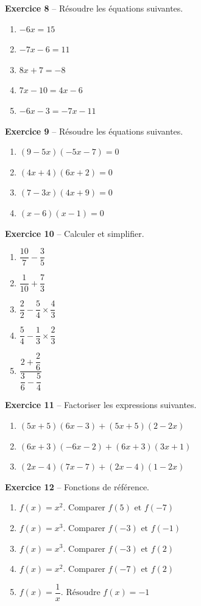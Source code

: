 \documentclass[12pt,a4paper,french]{article}
\begin{document}
\noindent\textbf{Exercice 8} -- Résoudre les équations suivantes.
\begin{enumerate}
\item $-6x = 15$
\item $-7x - 6 = 11$
\item $8x + 7 = -8$
\item $7x - 10 = 4x - 6$
\item $-6x - 3 = -7x - 11$
\end{enumerate}
\bigskip

\noindent\textbf{Exercice 9} -- Résoudre les équations suivantes.
\begin{enumerate}
\item $(9 - 5x)(-5x - 7) = 0$
\item $(4x + 4)(6x + 2) = 0$
\item $(7 - 3x)(4x + 9) = 0$
\item $(x - 6)(x - 1) = 0$
\end{enumerate}
\bigskip

\noindent\textbf{Exercice 10} -- Calculer et simplifier.
\begin{enumerate}
\item $\dfrac{10}{7} - \dfrac{3}{5}$
\item $\dfrac{1}{10} + \dfrac{7}{3}$
\item $\dfrac{2}{2} - \dfrac{5}{4} \times \dfrac{4}{3}$
\item $\dfrac{5}{4} - \dfrac{1}{3} \times \dfrac{2}{3}$
\item $\dfrac{2 + \dfrac{2}{6}}{\dfrac{3}{6} - \dfrac{5}{4}}$
\end{enumerate}
\bigskip

\noindent\textbf{Exercice 11} -- Factoriser les expressions suivantes.
\begin{enumerate}
\item $(5x + 5)(6x - 3) + (5x + 5)(2 - 2x)$
\item $(6x + 3)(-6x - 2) + (6x + 3)(3x + 1)$
\item $(2x - 4)(7x - 7) + (2x - 4)(1 - 2x)$
\end{enumerate}
\bigskip

\noindent\textbf{Exercice 12} -- Fonctions de référence.
\begin{enumerate}
\item $f(x) = x^2. \text{ Comparer } f(5) \text{ et } f(-7)$
\item $f(x) = x^3. \text{ Comparer } f(-3) \text{ et } f(-1)$
\item $f(x) = x^3. \text{ Comparer } f(-3) \text{ et } f(2)$
\item $f(x) = x^2. \text{ Comparer } f(-7) \text{ et } f(2)$
\item $f(x) = \dfrac{1}{x}. \text{ Résoudre } f(x) = -1$
\end{enumerate}
\bigskip
\end{document}
